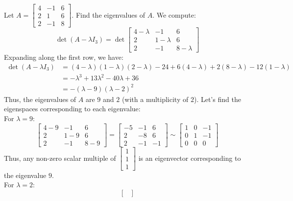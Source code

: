 \begin{eg}
    Let $A = \begin{bmatrix}
        4 & -1 & 6 \\
        2 & 1 & 6 \\
        2 & -1 & 8
    \end{bmatrix}$. Find the eigenvalues of $A$. We compute:
    \[\det(A - \lambda I_3) = \det\begin{bmatrix}
        4 - \lambda & -1 & 6 \\
        2 & 1 - \lambda & 6 \\
        2 & -1 & 8 - \lambda
    \end{bmatrix}\]
    Expanding along the first row, we have:
    \begin{align*}
        \det(A - \lambda I_3) &= (4 - \lambda)(1 - \lambda)(2 - \lambda) - 24  + 6(4 - \lambda) + 2 (8-\lambda) - 12 (1 - \lambda) \\
        &= -\lambda^3 + 13 \lambda^2 - 40 \lambda + 36 \\
        &= -(\lambda - 9)(\lambda - 2)^2
    \end{align*}
    Thus, the eigenvalues of $A$ are $9$ and $2$ (with a multiplicity of $2$). Let's find the eigenspaces corresponding to each eigenvalue: \\
    For $\lambda = 9$:
    \[\begin{bmatrix}
        4 - 9 & -1 & 6 \\
        2 & 1 - 9 & 6 \\
        2 & -1 & 8 - 9
    \end{bmatrix} = \begin{bmatrix}
        -5 & -1 & 6 \\
        2 & -8 & 6 \\
        2 & -1 & -1
    \end{bmatrix} \sim \begin{bmatrix}
        1 & 0 & -1 \\
        0 & 1 & -1 \\
        0 & 0 & 0
    \end{bmatrix}\]
    Thus, any non-zero scalar multiple of $\begin{bmatrix}
        1 \\ 1 \\ 1
    \end{bmatrix}$ is an eigenvector corresponding to the eigenvalue $9$. \\
    For $\lambda = 2$:
    \[\begin{bmatrix}

\end{bmatrix}\]
\end{eg}
